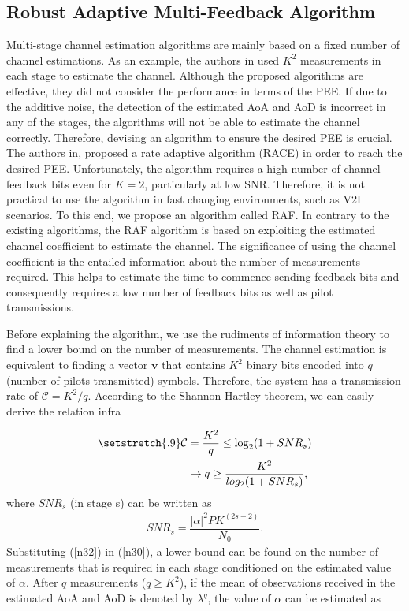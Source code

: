 \documentclass{ieeeaccess}
\begin{document}
\subsection{Robust Adaptive Multi-Feedback Algorithm}


Multi-stage channel estimation algorithms are mainly based on a fixed number of channel estimations. As an example, the authors in \cite{RH} used $K^2$ measurements in each stage to estimate the channel. Although the proposed algorithms are effective, they did not consider the performance in terms of the PEE. If due to the additive noise, the detection of the estimated AoA and AoD is incorrect in any of the stages, the algorithms will not be able to estimate the channel correctly. Therefore, devising an algorithm to ensure the desired PEE is crucial. The authors in\cite{RACE}, proposed a rate adaptive algorithm (RACE) in order to reach the desired PEE. Unfortunately, the algorithm requires a high number of channel feedback bits even for $K=2$, particularly at low SNR. Therefore, it is not practical to use the algorithm in fast changing environments, such as V2I scenarios. To this end, we propose an algorithm called RAF. In contrary to the existing algorithms, the RAF algorithm is based on exploiting the estimated channel coefficient to estimate the channel. The significance of using the channel coefficient is the entailed information about the number of measurements required. This helps to estimate the time to commence sending feedback bits and consequently requires a low number of feedback bits as well as pilot transmissions.



Before explaining the algorithm, we use the rudiments of information theory to find a lower bound on the number of measurements. The channel estimation is equivalent to finding a vector  $\boldsymbol{v}$ that contains $K^2$ binary bits encoded into $q$ (number of pilots transmitted) symbols. Therefore, the system has a transmission rate of $ \mathcal{C} = K^2/q$. According to the Shannon-Hartley theorem, we can easily derive the relation infra \cite{ref10}

\begin{align} \label{n30}
\setstretch{.9}
   \mathcal{C}  &= \dfrac{K^2}{q} \leq \log_2(1 + SNR_s)\nonumber \\
   &\rightarrow q \geq \dfrac{K^2}{log_2(1 + SNR_s)},
\end{align}
where $SNR_s$ (in stage s) can be written as
\begin{align} \label{n32}
	SNR_s = \dfrac{|\alpha|^2PK^{(2s-2)}}{N_0}.
\end{align}
Substituting (\ref{n32}) in (\ref{n30}), a lower bound can be found on the number of measurements that is required in each stage conditioned on the estimated value of $\alpha$. After $q$ measurements ($q \geq K^2$), if the mean of observations received in the estimated AoA and AoD is denoted by $\lambda^q$, the value of $\alpha$ can be estimated as
\end{document}
